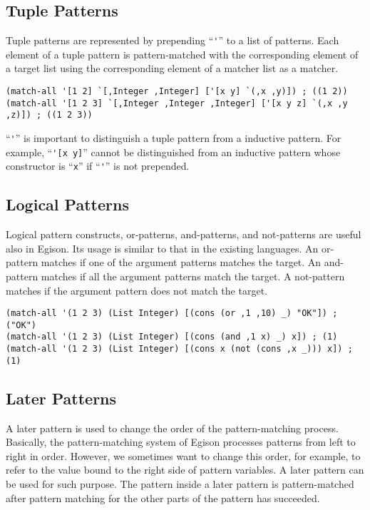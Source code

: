 \documentclass[acmlarge]{acmart}
\newcommand{\new}[1]{\textcolor{blue}{#1}}
\begin{document}
\subsection{Tuple Patterns}

Tuple patterns are represented by prepending ``\lstinline{'}'' to a list of patterns.
Each element of a tuple pattern is pattern-matched with the corresponding element of a target list using the corresponding element of a matcher list as a matcher.

\begin{lstlisting}[language=egison]
(match-all '[1 2] `[,Integer ,Integer] ['[x y] `(,x ,y)]) ; ((1 2))
(match-all '[1 2 3] `[,Integer ,Integer ,Integer] ['[x y z] `(,x ,y ,z)]) ; ((1 2 3))
\end{lstlisting}

``\lstinline{'}'' is important to distinguish a tuple pattern from a inductive pattern.
For example, ``\lstinline{'[x y]}'' cannot be distinguished from an inductive pattern whose constructor is ``\lstinline{x}'' if ``\lstinline{'}'' is not prepended.

\subsection{Logical Patterns}

Logical pattern constructs, or-patterns, and-patterns, and not-patterns are useful also in Egison.
Its usage is similar to that in the existing languages.
An or-pattern matches if one of the argument patterns matches the target.
An and-pattern matches if all the argument patterns match the target.
A not-pattern matches if the argument pattern does not match the target.

\begin{lstlisting}[language=egison]
(match-all '(1 2 3) (List Integer) [(cons (or ,1 ,10) _) "OK"]) ; ("OK")
(match-all '(1 2 3) (List Integer) [(cons (and ,1 x) _) x]) ; (1)
(match-all '(1 2 3) (List Integer) [(cons x (not (cons ,x _))) x]) ; (1)
\end{lstlisting}

\subsection{Later Patterns}

A later pattern is used to change the order of the pattern-matching process.
Basically, the pattern-matching system of Egison processes patterns from left to right in order.
However, we sometimes want to change this order, for example, to refer to the value bound to the right side of pattern variables.
A later pattern can be used for such purpose.
The pattern inside a later pattern is pattern-matched after pattern matching for the other parts of the pattern has succeeded.
\end{document}
